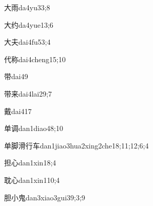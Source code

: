 \begin{verbete}{大雨}{da4yu3}{3;8}
\end{verbete}

\begin{verbete}{大约}{da4yue1}{3;6}
\end{verbete}

\begin{verbete}{大夫}{dai4fu5}{3;4}
\end{verbete}

\begin{verbete}{代称}{dai4cheng1}{5;10}
\end{verbete}

\begin{verbete}{带}{dai4}{9}
\end{verbete}

\begin{verbete}{带来}{dai4lai2}{9;7}
\end{verbete}

\begin{verbete}{戴}{dai4}{17}
\end{verbete}

\begin{verbete}{单调}{dan1diao4}{8;10}
\end{verbete}

\begin{verbete}{单脚滑行车}{dan1jiao3hua2xing2che1}{8;11;12;6;4}
\end{verbete}

\begin{verbete}{担心}{dan1xin1}{8;4}
\end{verbete}

\begin{verbete}{耽心}{dan1xin1}{10;4}
\end{verbete}

\begin{verbete}{胆小鬼}{dan3xiao3gui3}{9;3;9}
\end{verbete}

